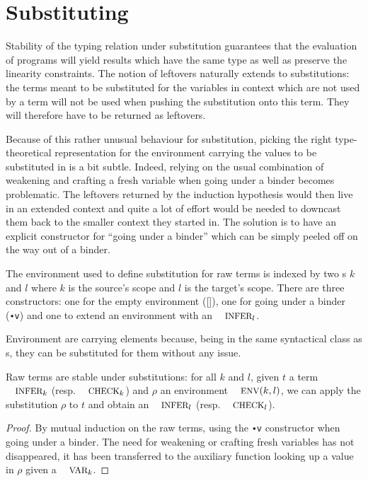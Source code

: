 \documentclass[a4paper,UKenglish]{lipics-v2016}
\begin{document}

\section{Substituting}

Stability of the typing relation under substitution guarantees
that the evaluation of programs will yield results which have
the same type as well as preserve the linearity constraints.
The notion of leftovers naturally extends to substitutions: the
terms meant to be substituted for the variables in context which
are not used by a term will not be used when pushing the substitution
onto this term. They will therefore have to be returned as leftovers.

Because of this rather unusual behaviour for substitution, picking
the right type-theoretical representation for the environment
carrying the values to be substituted in is a bit subtle. Indeed,
relying on the usual combination of weakening and crafting a fresh
variable when going under a binder becomes problematic. The leftovers
returned by the induction hypothesis would then live in an extended
context and quite a lot of effort would be needed to downcast them
back to the smaller context they started in. The solution is to have
an explicit constructor for ``going under a binder'' which can be
simply peeled off on the way out of a binder.

\begin{definition}The environment \Env{} used to define substitution
for raw terms is indexed by two \Nat{}s $k$ and $l$ where $k$ is the
source's scope and $l$ is the target's scope. There are three constructors:
one for the empty environment ([]), one for going under a binder (\texttt{∙v})
and one to extend an environment with an $\Inferable{l}$.
\end{definition}

Environment are carrying \Inferable{} elements because, being in the
same syntactical class as \Var{}s, they can be substituted for them
without any issue.

\begin{lemma}Raw terms are stable under substitutions: for all $k$ and
$l$, given $t$ a term $\Inferable{k}$ (resp. $\Checkable{k}$) and $ρ$
an environment $\Env{}(k,l)$, we can apply the substitution $ρ$ to $t$
and obtain an $\Inferable{l}$ (resp. $\Checkable{l}$).
\end{lemma}
\begin{proof}By mutual induction on the raw terms, using the \texttt{∙v}
\Env{} constructor when going under a binder. The need for weakening or
crafting fresh variables has not disappeared, it has been transferred to
the auxiliary function looking up a value in $ρ$ given a $\Var{k}$.
\end{proof}
\end{document}

